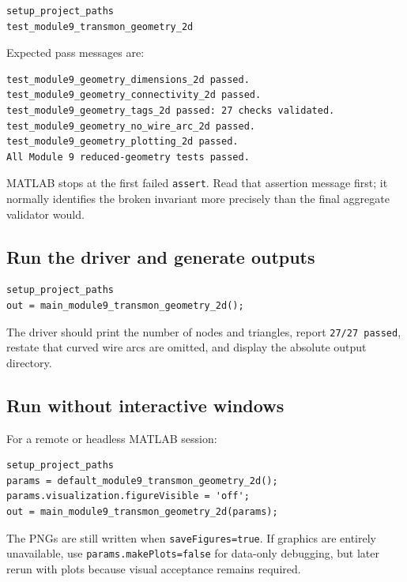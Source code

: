 \documentclass[11pt]{article}
\begin{document}
\begin{lstlisting}[style=projectmatlab]
setup_project_paths
test_module9_transmon_geometry_2d
\end{lstlisting}

Expected pass messages are:

\begin{lstlisting}[style=projectshell]
test_module9_geometry_dimensions_2d passed.
test_module9_geometry_connectivity_2d passed.
test_module9_geometry_tags_2d passed: 27 checks validated.
test_module9_geometry_no_wire_arc_2d passed.
test_module9_geometry_plotting_2d passed.
All Module 9 reduced-geometry tests passed.
\end{lstlisting}

MATLAB stops at the first failed \texttt{assert}. Read that assertion message first; it normally identifies the broken invariant more precisely than the final aggregate validator would.

\subsection{Run the driver and generate outputs}

\begin{lstlisting}[style=projectmatlab]
setup_project_paths
out = main_module9_transmon_geometry_2d();
\end{lstlisting}

The driver should print the number of nodes and triangles, report \texttt{27/27 passed}, restate that curved wire arcs are omitted, and display the absolute output directory.

\subsection{Run without interactive windows}

For a remote or headless MATLAB session:

\begin{lstlisting}[style=projectmatlab]
setup_project_paths
params = default_module9_transmon_geometry_2d();
params.visualization.figureVisible = 'off';
out = main_module9_transmon_geometry_2d(params);
\end{lstlisting}

The PNGs are still written when \texttt{saveFigures=true}. If graphics are entirely unavailable, use \texttt{params.makePlots=false} for data-only debugging, but later rerun with plots because visual acceptance remains required.
\end{document}
